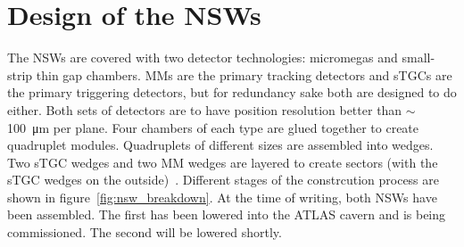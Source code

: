 \section{Design of the NSWs}

The NSWs are covered with two detector technologies: micromegas and small-strip thin gap chambers. MMs are the primary tracking detectors and sTGCs are the primary triggering detectors, but for redundancy sake both are designed to do either. Both sets of detectors are to have position resolution better than $\sim$\SI{100}{\micro\meter} per plane. Four chambers of each type are glued together to create quadruplet modules. Quadruplets of different sizes are assembled into wedges. Two sTGC wedges and two MM wedges are layered to create sectors (with the sTGC wedges on the outside)~\cite{nsw_tdr}. Different stages of the constrcution process are shown in figure~\ref{fig:nsw_breakdown}. At the time of writing, both NSWs have been assembled. The first has been lowered into the ATLAS cavern and is being commissioned. The second will be lowered shortly. 

